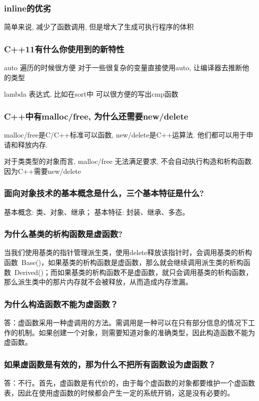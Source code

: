 \documentclass[UTF8]{ctexart}
\begin{document}
\subsubsection{inline的优劣}
简单来说, 减少了函数调用, 但是增大了生成可执行程序的体积 \par
\subsubsection{C++11有什么你使用到的新特性}
auto 遍历的时候很方便 对于一些很复杂的变量直接使用auto, 让编译器去推断他的类型\par
lambda 表达式, 比如在sort中 可以很方便的写出cmp函数 \par
\subsubsection{C++中有malloc/free, 为什么还需要new/delete}
malloc/free是C/C++标准可以函数, new/delete是C++运算法. 他们都可以用于申请和释放内存. \par
对于类类型的对象而言, malloc/free 无法满足要求, 不会自动执行构造和析构函数. 因为C++需要new/delete \par
\subsubsection{面向对象技术的基本概念是什么，三个基本特征是什么?}
基本概念: 类、对象、继承； 基本特征: 封装、继承、多态。\par
\subsubsection{为什么基类的析构函数是虚函数?}
当我们使用基类的指针管理派生类，使用delete释放该指针时，会调用基类的析构函数~Base()，如果基类的析构函数是虚函数，那么就会继续调用派生类的析构函数~Derived()；而如果基类的析构函数不是虚函数，就只会调用基类的析构函数，那么派生类中的那片内存就不会被释放，从而造成内存泄漏。 \par
\subsubsection{为什么构造函数不能为虚函数？}
答：虚函数采用一种虚调用的方法。需调用是一种可以在只有部分信息的情况下工作的机制。如果创建一个对象，则需要知道对象的准确类型，因此构造函数不能为虚函数。 \par

\subsubsection{如果虚函数是有效的，那为什么不把所有函数设为虚函数？}
答：不行。首先，虚函数是有代价的，由于每个虚函数的对象都要维护一个虚函数表，因此在使用虚函数的时候都会产生一定的系统开销，这是没有必要的。
\end{document}
